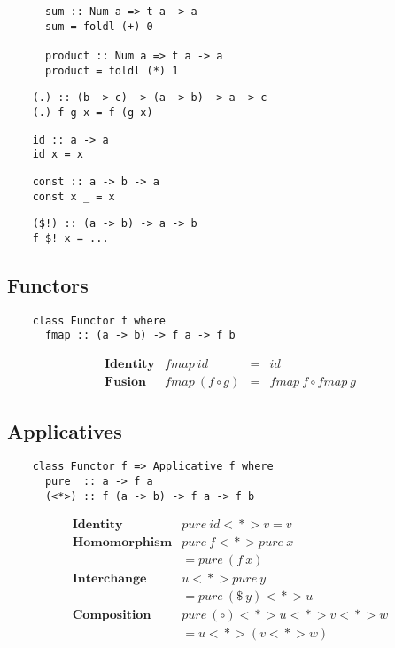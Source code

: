 \begin{multicols}{2}
\begin{verbatim}
	  sum :: Num a => t a -> a 
	  sum = foldl (+) 0
	  
	  product :: Num a => t a -> a
	  product = foldl (*) 1
	\end{verbatim}
	
	\begin{verbatim}
	(.) :: (b -> c) -> (a -> b) -> a -> c
	(.) f g x = f (g x)
	\end{verbatim}
	
	\begin{verbatim}
	id :: a -> a
	id x = x
	\end{verbatim}
	
	\begin{verbatim}
	const :: a -> b -> a
	const x _ = x
	\end{verbatim}
	
	\begin{verbatim}
	($!) :: (a -> b) -> a -> b
	f $! x = ...
	\end{verbatim}
	
	\subsection*{Functors}
	
	\begin{verbatim}
	class Functor f where 
	  fmap :: (a -> b) -> f a -> f b
	\end{verbatim}
	\begin{displaymath}
	\begin{array}{lrcl}
	\textbf{Identity} & \mathit{fmap}~\mathit{id} & = &  \mathit{id} \\
	\textbf{Fusion} & \mathit{fmap}~(f \circ g) & = & \mathit{fmap}~f \circ \mathit{fmap}~g
	\end{array}
	\end{displaymath}
	
	\subsection*{Applicatives}
	
	\begin{verbatim}
	class Functor f => Applicative f where 
	  pure  :: a -> f a
	  (<*>) :: f (a -> b) -> f a -> f b
	\end{verbatim}
	\begin{displaymath}
	\begin{array}{lr}
	\textbf{Identity} & \mathit{pure}~\mathit{id} <\!\!*\!\!> v = v \\ 
	\textbf{Homomorphism} & \mathit{pure}~f <\!\!*\!\!> \mathit{pure}~x \\& = \mathit{pure}~(f~x) \\
	\textbf{Interchange} & u <\!\!*\!\!> \mathit{pure}~y \\
	& = \mathit{pure}~(\$~y) <\!\!*\!\!> u \\
	\textbf{Composition} & \mathit{pure}~(\circ) <\!\!*\!\!> u <\!\!*\!\!> v <\!\!*\!\!> w  \\
	& = u <\!\!*\!\!> (v <\!\!*\!\!> w)
	\end{array}
	\end{displaymath}
	

\end{multicols}
